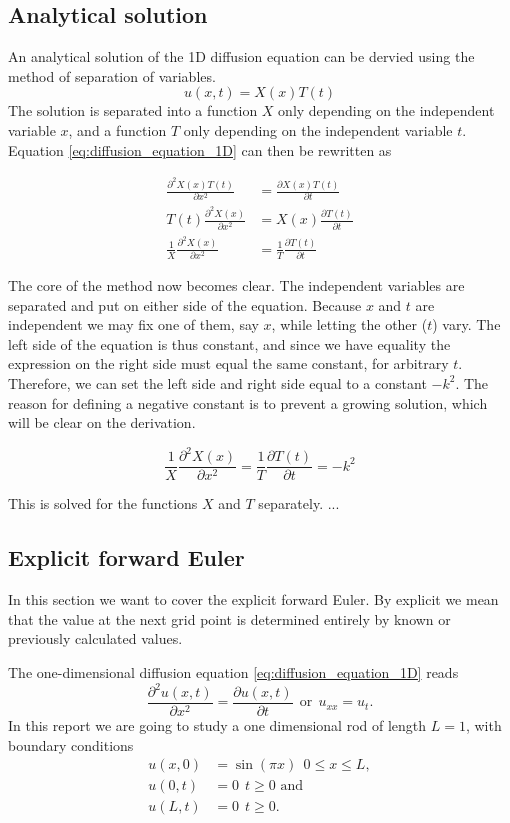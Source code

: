 \documentclass[12pt]{extarticle}
\begin{document}
\subsection{Analytical solution}
An analytical solution of the 1D diffusion equation can be dervied using the method of separation of variables.
\[ u(x,t) = X(x)T(t) \]
The solution is separated into a function $X$ only depending on the independent variable $x$, and a function $T$ only depending on the independent variable $t$. Equation \ref{eq:diffusion_equation_1D} can then be rewritten as

\begin{align*}
	\frac{\partial^2 X(x)T(t)}{\partial x^2} &= \frac{\partial X(x)T(t)}{\partial t} \\
	T(t)\frac{\partial^2 X(x)}{\partial x^2} &= X(x)\frac{\partial T(t)}{\partial t} \\
	\frac{1}{X}\frac{\partial^2 X(x)}{\partial x^2} &= \frac{1}{T}\frac{\partial T(t)}{\partial t}
\end{align*}

The core of the method now becomes clear. The independent variables are separated and put on either side of the equation. Because $x$ and $t$ are independent we may fix one of them, say $x$, while letting the other ($t$) vary. The left side of the equation is thus constant, and since we have equality the expression on the right side must equal the same constant, for arbitrary $t$. Therefore, we can set the left side and right side equal to a constant $-k^2$. The reason for defining a negative constant is to prevent a growing solution, which will be clear on the derivation.

\[ \frac{1}{X}\frac{\partial^2 X(x)}{\partial x^2} = \frac{1}{T}\frac{\partial T(t)}{\partial t} = -k^2\]

This is solved for the functions $X$ and $T$ separately. ...

\subsection*{Explicit forward Euler}
In this section we want to cover the explicit forward Euler. By explicit we mean that the value at the next grid point is determined entirely by known or previously calculated values.

The one-dimensional diffusion equation \eqref{eq:diffusion_equation_1D} reads 
\begin{equation}
\frac{\partial^2u(x, t)}{\partial x^2} = \frac{\partial u(x,t)}{\partial t} \ \ \text{or} \ \ u_{xx} = u_t.
\end{equation}
In this report we are going to study a one dimensional rod of length $L=1$, with boundary conditions
\begin{align}
	u(x,0) &= \sin(\pi x) \ \ 0\leq x\leq L,\\
	u(0,t) &= 0 \ \ t\geq 0 \text{ and} \\
	u(L,t) &= 0 \ \ t\geq 0.
\end{align}
\end{document}
